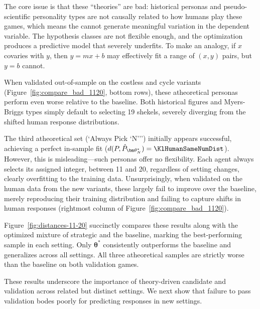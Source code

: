 The core issue is that these ``theories'' are bad: historical personas and pseudo-scientific personality types are not causally related to how humans play these games, which means the  cannot generate meaningful variation in the dependent variable.
The hypothesis classes are not flexible enough, and the optimization produces a predictive model that severely underfits.
To make an analogy, if $x$ covaries with $y$, then $y = mx + b$ may effectively fit a range of $(x,y)$ pairs, but $y = b$ cannot.

When validated out-of-sample on the costless and cycle variants (Figure~\ref{fig:compare_bad_1120}, bottom rows), these atheoretical personas perform even worse relative to the baseline. 
Both historical figures and Myers-Briggs types simply default to selecting 19 shekels, severely diverging from the shifted human response distributions.

The third atheoretical set (`Always Pick `N''') initially appears successful, achieving a perfect in-sample fit ($d(P, \hat P_{\bm\theta^*_{N}}) = \KlHumanSameNumDist$).
However, this is misleading---such personas offer no flexibility. 
Each agent always selects its assigned integer, between 11 and 20, regardless of setting changes, clearly overfitting to the training data.
Unsurprisingly, when validated on the human data from the new variants, these largely fail to improve over the baseline, merely reproducing their training distribution and failing to capture shifts in human responses (rightmost column of Figure~\ref{fig:compare_bad_1120}). 

Figure~\ref{fig:distances-11-20} succinctly compares these results along with the optimized mixture of strategic  and the baseline, marking the best-performing sample in each setting. 
Only $\bm{\theta}^*$ consistently outperforms the baseline and generalizes across all settings.
All three atheoretical samples are strictly worse than the baseline on both validation games.

These results underscore the importance of theory-driven candidate  and validation across related but distinct settings.
We next show that failure to pass validation bodes poorly for predicting responses in new settings.
